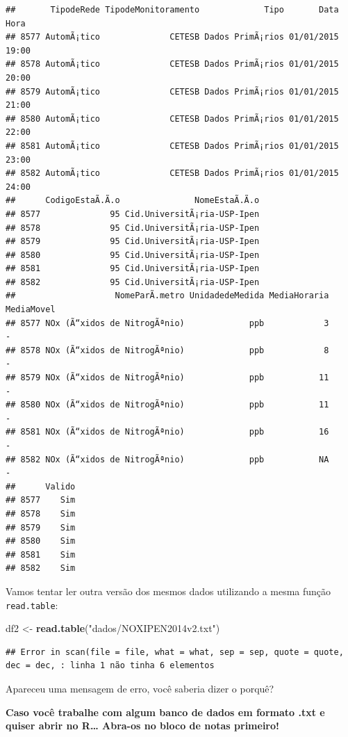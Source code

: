 \documentclass[]{book}
\newenvironment{Shaded}{\begin{snugshade}}{\end{snugshade}}
\newcommand{\KeywordTok}[1]{\textcolor[rgb]{0.13,0.29,0.53}{\textbf{#1}}}
\newcommand{\StringTok}[1]{\textcolor[rgb]{0.31,0.60,0.02}{#1}}
\newcommand{\NormalTok}[1]{#1}
\theoremstyle{definition}
\theoremstyle{definition}
\theoremstyle{definition}
\theoremstyle{remark}
\begin{document}
\begin{verbatim}
##       TipodeRede TipodeMonitoramento             Tipo       Data  Hora
## 8577 AutomÃ¡tico              CETESB Dados PrimÃ¡rios 01/01/2015 19:00
## 8578 AutomÃ¡tico              CETESB Dados PrimÃ¡rios 01/01/2015 20:00
## 8579 AutomÃ¡tico              CETESB Dados PrimÃ¡rios 01/01/2015 21:00
## 8580 AutomÃ¡tico              CETESB Dados PrimÃ¡rios 01/01/2015 22:00
## 8581 AutomÃ¡tico              CETESB Dados PrimÃ¡rios 01/01/2015 23:00
## 8582 AutomÃ¡tico              CETESB Dados PrimÃ¡rios 01/01/2015 24:00
##      CodigoEstaÃ.Ã.o               NomeEstaÃ.Ã.o
## 8577              95 Cid.UniversitÃ¡ria-USP-Ipen
## 8578              95 Cid.UniversitÃ¡ria-USP-Ipen
## 8579              95 Cid.UniversitÃ¡ria-USP-Ipen
## 8580              95 Cid.UniversitÃ¡ria-USP-Ipen
## 8581              95 Cid.UniversitÃ¡ria-USP-Ipen
## 8582              95 Cid.UniversitÃ¡ria-USP-Ipen
##                    NomeParÃ.metro UnidadedeMedida MediaHoraria MediaMovel
## 8577 NOx (Ã“xidos de NitrogÃªnio)             ppb            3          -
## 8578 NOx (Ã“xidos de NitrogÃªnio)             ppb            8          -
## 8579 NOx (Ã“xidos de NitrogÃªnio)             ppb           11          -
## 8580 NOx (Ã“xidos de NitrogÃªnio)             ppb           11          -
## 8581 NOx (Ã“xidos de NitrogÃªnio)             ppb           16          -
## 8582 NOx (Ã“xidos de NitrogÃªnio)             ppb           NA          -
##      Valido
## 8577    Sim
## 8578    Sim
## 8579    Sim
## 8580    Sim
## 8581    Sim
## 8582    Sim
\end{verbatim}

Vamos tentar ler outra versão dos mesmos dados utilizando a mesma função
\texttt{read.table}:

\begin{Shaded}
\begin{Highlighting}[]
\NormalTok{df2 <-}\StringTok{ }\KeywordTok{read.table}\NormalTok{(}\StringTok{"dados/NOXIPEN2014v2.txt"}\NormalTok{)}
\end{Highlighting}
\end{Shaded}

\begin{verbatim}
## Error in scan(file = file, what = what, sep = sep, quote = quote, dec = dec, : linha 1 não tinha 6 elementos
\end{verbatim}

Apareceu uma mensagem de erro, {você saberia dizer o porquê?}

\textbf{Caso você trabalhe com algum banco de dados em formato .txt e
quiser abrir no R\ldots{} Abra-os no bloco de notas primeiro!}
\end{document}
